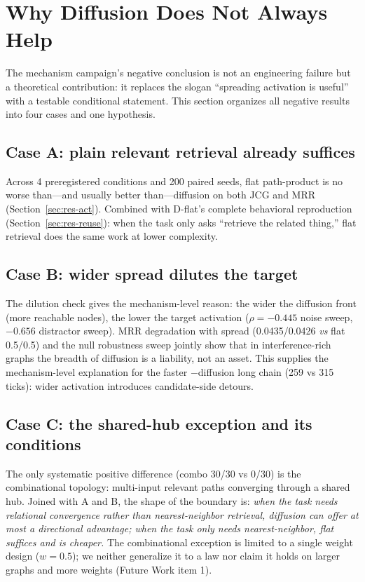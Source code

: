 \documentclass[10pt,a4paper]{article}
\begin{document}
\section{Why Diffusion Does Not Always Help}
\label{sec:whydiff}

The mechanism campaign's negative conclusion is not an engineering failure but a theoretical contribution: it replaces the slogan ``spreading activation is useful'' with a testable conditional statement. This section organizes all negative results into four cases and one hypothesis.

\subsection{Case A: plain relevant retrieval already suffices}
Across 4 preregistered conditions and 200 paired seeds, flat path-product is no worse than---and usually better than---diffusion on both JCG and MRR (Section~\ref{sec:res-act}). Combined with D-flat's complete behavioral reproduction (Section~\ref{sec:res-reuse}): when the task only asks ``retrieve the related thing,'' flat retrieval does the same work at lower complexity.

\subsection{Case B: wider spread dilutes the target}
The dilution check gives the mechanism-level reason: the wider the diffusion front (more reachable nodes), the lower the target activation ($\rho{=}{-}0.445$ noise sweep, ${-}0.656$ distractor sweep). MRR degradation with spread (0.0435/0.0426 \emph{vs} flat 0.5/0.5) and the null robustness sweep jointly show that in interference-rich graphs the breadth of diffusion is a liability, not an asset. This supplies the mechanism-level explanation for the faster $-$diffusion long chain (259 vs 315 ticks): wider activation introduces candidate-side detours.

\subsection{Case C: the shared-hub exception and its conditions}
The only systematic positive difference (combo 30/30 vs 0/30) is the combinational topology: multi-input relevant paths converging through a shared hub. Joined with A and B, the shape of the boundary is: \emph{when the task needs relational convergence rather than nearest-neighbor retrieval, diffusion can offer at most a directional advantage; when the task only needs nearest-neighbor, flat suffices and is cheaper.} The combinational exception is limited to a single weight design ($w{=}0.5$); we neither generalize it to a law nor claim it holds on larger graphs and more weights (Future Work item 1).
\end{document}
